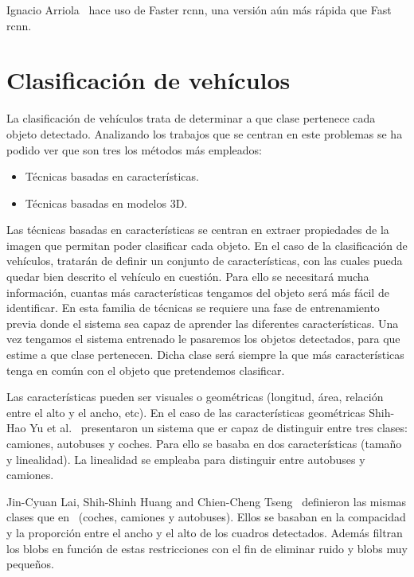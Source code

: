 Ignacio Arriola~\cite{tesis_ignacio_arriola} hace uso de Faster \acrshort{rcnn}, una versión aún más rápida que Fast \acrshort{rcnn}.




\section{Clasificación de vehículos}

La clasificación de vehículos trata de determinar a que clase pertenece cada objeto detectado. Analizando los trabajos que se centran en este problemas se ha podido ver que son tres los métodos más empleados:
\begin{itemize}
    \item Técnicas basadas en características.
    \item Técnicas basadas en modelos 3D.
\end{itemize}

Las técnicas basadas en características se centran en extraer propiedades de la imagen que permitan poder clasificar cada objeto. En el caso de la clasificación de vehículos, tratarán de definir un conjunto de características, con las cuales pueda quedar bien descrito el vehículo en cuestión. Para ello se necesitará mucha información, cuantas más características tengamos del objeto será más fácil de identificar. En esta familia de técnicas se requiere una fase de entrenamiento previa donde el sistema sea capaz de aprender las diferentes características. Una vez tengamos el sistema entrenado le pasaremos los objetos detectados, para que estime a que clase pertenecen. Dicha clase será siempre la que más características tenga en común con el objeto que pretendemos clasificar.
 
Las características pueden ser visuales o geométricas (longitud, área, relación  entre el alto y el ancho, etc). En el caso de las características geométricas Shih-Hao Yu et al.~\cite{an_Automatic_traffic} presentaron un sistema que er capaz de distinguir entre tres clases: camiones, autobuses y coches. Para ello se basaba en dos características (tamaño y linealidad). La linealidad se empleaba para distinguir entre autobuses y camiones.

Jin-Cyuan Lai, Shih-Shinh Huang and Chien-Cheng Tseng~\cite{image_based_vehicle} definieron las mismas clases que en ~\cite{an_Automatic_traffic}(coches, camiones y autobuses). Ellos se basaban en la compacidad y la proporción entre el ancho y el alto de los cuadros detectados. Además filtran los blobs en función de estas restricciones con el fin de eliminar ruido y blobs muy pequeños.

